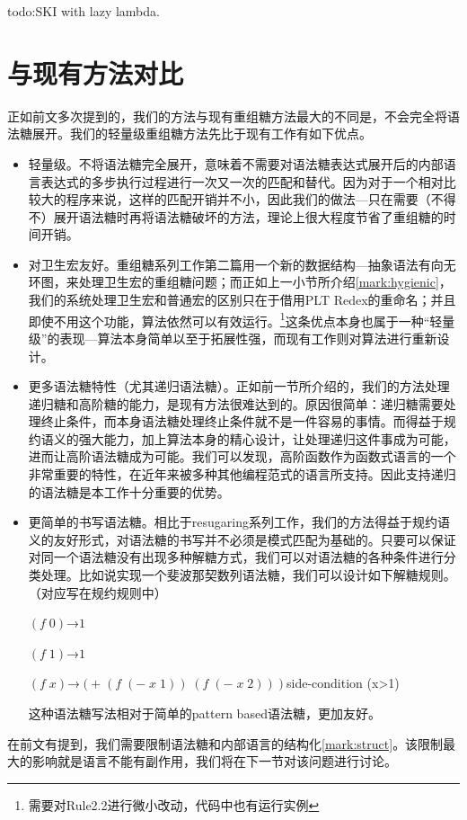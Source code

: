 todo:SKI with lazy lambda.

\section{与现有方法对比}
正如前文多次提到的，我们的方法与现有重组糖方法最大的不同是，不会完全将语法糖展开。我们的轻量级重组糖方法先比于现有工作有如下优点。
\begin{itemize}
	\item 轻量级。不将语法糖完全展开，意味着不需要对语法糖表达式展开后的内部语言表达式的多步执行过程进行一次又一次的匹配和替代。因为对于一个相对比较大的程序来说，这样的匹配开销并不小，因此我们的做法---只在需要（不得不）展开语法糖时再将语法糖破坏的方法，理论上很大程度节省了重组糖的时间开销。
	\item 对卫生宏友好。重组糖系列工作第二篇用一个新的数据结构---抽象语法有向无环图，来处理卫生宏的重组糖问题；而正如上一小节所介绍\ref{mark:hygienic}，我们的系统处理卫生宏和普通宏的区别只在于借用PLT Redex的重命名；并且即使不用这个功能，算法依然可以有效运行。\footnote{需要对Rule2.2进行微小改动，代码中也有运行实例}这条优点本身也属于一种“轻量级”的表现---算法本身简单以至于拓展性强，而现有工作则对算法进行重新设计。
	\item 更多语法糖特性（尤其递归语法糖）。正如前一节所介绍的，我们的方法处理递归糖和高阶糖的能力，是现有方法很难达到的。原因很简单：递归糖需要处理终止条件，而本身语法糖处理终止条件就不是一件容易的事情。而得益于规约语义的强大能力，加上算法本身的精心设计，让处理递归这件事成为可能，进而让高阶语法糖成为可能。我们可以发现，高阶函数作为函数式语言的一个非常重要的特性，在近年来被多种其他编程范式的语言所支持。因此支持递归的语法糖是本工作十分重要的优势。
	\item 更简单的书写语法糖。相比于resugaring系列工作，我们的方法得益于规约语义的友好形式，对语法糖的书写并不必须是模式匹配为基础的。只要可以保证对同一个语法糖没有出现多种解糖方式，我们可以对语法糖的各种条件进行分类处理。比如说实现一个斐波那契数列语法糖，我们可以设计如下解糖规则。（对应写在规约规则中）
	
	$(f\;0)$→$1$
	
	$(f\;1)$→$1$
	
	$(f\;x)$→$(+\;(f\;(-\;x\;1))\;(f\;(-\;x\;2)))$\qquad side-condition (x>1)
	
	这种语法糖写法相对于简单的pattern based语法糖，更加友好。
\end{itemize}

在前文有提到，我们需要限制语法糖和内部语言的结构化\ref{mark:struct}。该限制最大的影响就是语言不能有副作用，我们将在下一节对该问题进行讨论。
